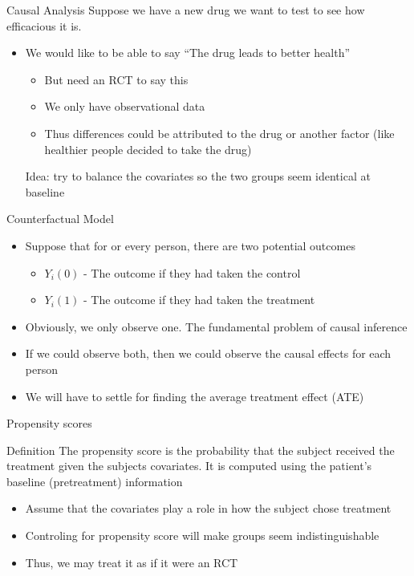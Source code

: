 \begin{frame}{Causal Analysis}
Suppose we have a new drug we want to test to see how efficacious it is.
 \begin{itemize}
  \item We would like to be able to say ``The drug leads to better health''
  \begin{itemize}
   \item But need an RCT to say this
   \item We only have observational data
   \item Thus differences could be attributed to the drug or another factor (like healthier people
   decided to take the drug)
  \end{itemize}
Idea: try to balance the covariates so the two groups seem identical at baseline
 \end{itemize}

\end{frame}

\begin{frame}{Counterfactual Model}
\begin{itemize}
 \item Suppose that for or every person, there are two potential outcomes
 \begin{itemize}
  \item $Y_i(0)$ - The outcome if they had taken the control
  \item $Y_i(1)$ - The outcome if they had taken the treatment
 \end{itemize}
\item Obviously, we only observe one. The fundamental problem of causal inference
\item If we could observe both, then we could observe the causal effects for each person
\item We will have to settle for finding the average treatment effect (ATE)
\end{itemize}
 
\end{frame}

\begin{frame}{Propensity scores}
\begin{block}{Definition}
The propensity score is the probability that the subject received the treatment given the subjects
covariates. It is computed using the patient's baseline (pretreatment) information \cite{Rosenbaum1983}
\end{block}
 \begin{itemize}
  \item Assume that the covariates play a role in how the subject chose treatment
  \item Controling for propensity score will make groups seem indistinguishable
  \item Thus, we may treat it as if it were an RCT
 \end{itemize}

\end{frame}

